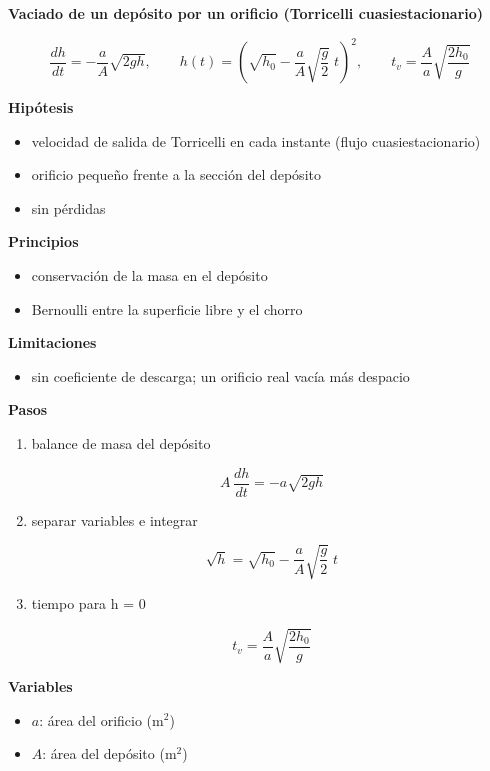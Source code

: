 \documentclass[10pt,openany]{book}
\begin{document}
\begin{tcolorbox}[title={Desarrollos del modelo}, studiumdef, breakable]
\noindent\textbf{Vaciado de un depósito por un orificio (Torricelli cuasiestacionario)}

\begin{equation}
\frac{dh}{dt} = -\frac{a}{A}\sqrt{2gh},\qquad h(t) = \left(\sqrt{h_0} - \frac{a}{A}\sqrt{\frac{g}{2}}\;t\right)^{2},\qquad t_v = \frac{A}{a}\sqrt{\frac{2h_0}{g}}
\label{eq:m04-vaciado}
\end{equation}

\noindent\textbf{Hipótesis}
\begin{itemize}
\item velocidad de salida de Torricelli en cada instante (flujo cuasiestacionario)
\item orificio pequeño frente a la sección del depósito
\item sin pérdidas
\end{itemize}

\noindent\textbf{Principios}
\begin{itemize}
\item conservación de la masa en el depósito
\item Bernoulli entre la superficie libre y el chorro
\end{itemize}

\noindent\textbf{Limitaciones}
\begin{itemize}
\item sin coeficiente de descarga; un orificio real vacía más despacio
\end{itemize}

\noindent\textbf{Pasos}
\begin{enumerate}
\item
balance de masa del depósito

\[
A\,\frac{dh}{dt} = -a\sqrt{2gh}
\]
\item
separar variables e integrar

\[
\sqrt{h} = \sqrt{h_0} - \frac{a}{A}\sqrt{\frac{g}{2}}\;t
\]
\item
tiempo para h = 0

\[
t_v = \frac{A}{a}\sqrt{\frac{2h_0}{g}}
\]
\end{enumerate}

\noindent\textbf{Variables}
\begin{itemize}
\item $a$: área del orificio ($\mathrm{m}^{2}$)
\item $A$: área del depósito ($\mathrm{m}^{2}$)
\end{itemize}


\end{tcolorbox}
\end{document}
